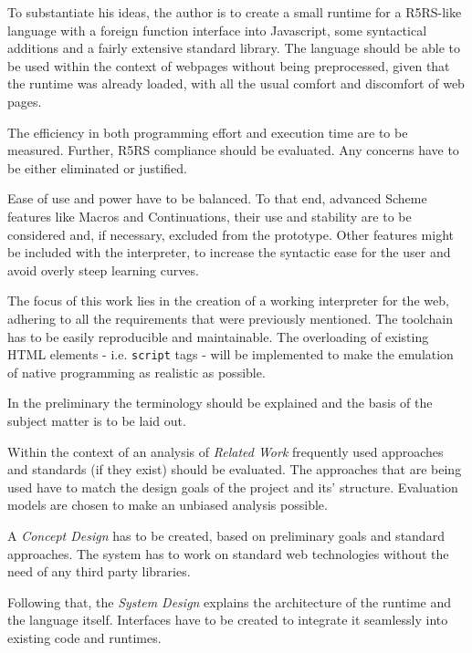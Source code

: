 \documentclass[oneside,11pt,xetex]{scrbook}
\begin{document}
To substantiate his ideas, the author is to create a small runtime for a R5RS-like language with a foreign function interface into Javascript, some syntactical additions and a fairly extensive standard library. The language should be able to be used within the context of webpages without being preprocessed, given that the runtime was already loaded, with all the usual comfort and discomfort of web pages.
\vspace{0.3cm}

The efficiency in both programming effort and execution time are to be measured. Further, R5RS compliance should be evaluated. Any concerns have to be either eliminated or justified.
\vspace{0.3cm}

Ease of use and power have to be balanced. To that end, advanced Scheme features like Macros and Continuations, their use and stability are to be considered and, if necessary, excluded from the prototype. Other features might be included with the interpreter, to increase the syntactic ease for the user and avoid overly steep learning curves.
\vspace{0.3cm}

The focus of this work lies in the creation of a working interpreter for the web, adhering to all the requirements that were previously mentioned. The toolchain has to be easily reproducible and maintainable. The overloading of existing HTML elements - i.e. \texttt{script} tags - will be implemented to make the emulation of native programming as realistic as possible.
\vspace{0.3cm}

In the preliminary the terminology should be explained and the basis of the subject matter is to be laid out.

Within the context of an analysis of \emph{Related Work} frequently used approaches and standards (if they exist) should be evaluated. The approaches that are being used have to match the design goals of the project and its' structure. Evaluation models are chosen to make an unbiased analysis possible.

A \emph{Concept Design} has to be created, based on preliminary goals and standard approaches. The system has to work on standard web technologies without the need of any third party libraries.

Following that, the \emph{System Design} explains the architecture of the runtime and the language itself. Interfaces have to be created to integrate it seamlessly into existing code and runtimes.
\end{document}
